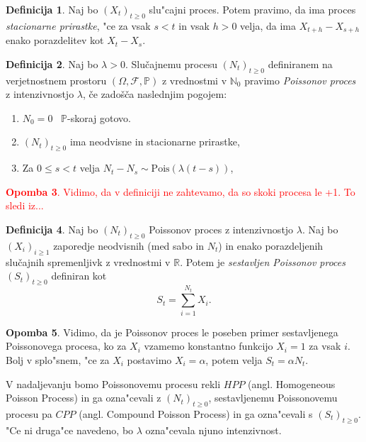 \documentclass[12pt, a4paper, reqno]{amsart}
\theoremstyle{definition} %
\newtheorem{definicija}{Definicija}[section]
\newtheorem{opomba}[definicija]{Opomba}
\theoremstyle{plain} %
\newcommand{\N}{\mathbb{N}}
\newcommand{\Prob}{\mathbb{P}}
\newcommand{\1}{\mathds{1}}
\newcommand{\Pois}[1]{\text{Pois}(#1)}
\begin{document}
    \begin{definicija}
        Naj bo $(X_t)_{t\geq0}$ slu"cajni proces. Potem pravimo, da ima proces
        \textit{stacionarne prirastke}, "ce za vsak $s < t$ in vsak $h > 0$ velja, 
        da ima $X_{t+h} - X_{s+h}$ enako porazdelitev kot $X_t - X_s$.
        \label{def:stacPrir}
    \end{definicija}

    \begin{definicija}
        Naj bo $\lambda > 0$. Slučajnemu procesu $(N_t)_{t\geq 0}$ definiranem na verjetnostnem 
        prostoru $(\Omega, \mathcal{F}, \mathbb{P})$ z vrednostmi v $\N_0$ pravimo 
        \textit{Poissonov proces} z intenzivnostjo $\lambda$, če zadošča naslednjim pogojem:
        \begin{enumerate}
            \item $N_0 = 0$ \ $\Prob$-skoraj gotovo.
            \item $(N_t)_{t\geq 0}$ ima neodvisne in stacionarne prirastke,
            \item Za $0 \leq s < t$ velja $ N_t - N_s \sim\Pois{\lambda(t - s)}$,
        \end{enumerate}
        \label{def:HPP}
    \end{definicija}
\textcolor{red}{
    \begin{opomba}
        Vidimo, da v definiciji ne zahtevamo, da so skoki procesa le +1. To sledi iz...
        \label{op:skoki}
    \end{opomba}
}
    \begin{definicija}
        Naj bo $(N_t)_{t\geq0}$ Poissonov proces z intenzivnostjo $\lambda$. 
        Naj bo $(X_i)_{i\geq1}$ zaporedje neodvisnih (med sabo in $N_t$) in enako 
        porazdeljenih slučajnih spremenljivk z vrednostmi v $\mathbb{R}$. Potem je 
        \textit{sestavljen Poissonov proces} $(S_t)_{t\geq0}$ definiran kot
        $$
            S_t = \sum_{i=1}^{N_t} X_i.
        $$
        \label{def:CPP}
    \end{definicija}

    \begin{opomba}
        Vidimo, da je Poissonov proces le poseben primer sestavljenega Poissonovega procesa, ko za
        $X_i$ vzamemo konstantno funkcijo $X_i = 1$ za vsak $i$. Bolj v splo"snem, "ce za $X_i$ 
        postavimo $X_i = \alpha$, potem velja $S_t = \alpha N_t$.
        \label{op:CPPHPPPovezava}
    \end{opomba}

    V nadaljevanju bomo Poissonovemu procesu rekli $HPP$ (angl. Homogeneous Poisson Process) in ga
    ozna"cevali z $(N_t)_{t\geq0}$, sestavljenemu Poissonovemu procesu pa $CPP$ (angl. Compound Poisson 
    Process) in ga ozna"cevali s $(S_t)_{t\geq0}$. "Ce ni druga"ce navedeno, bo $\lambda$ ozna"cevala
    njuno intenzivnost.
\end{document}
